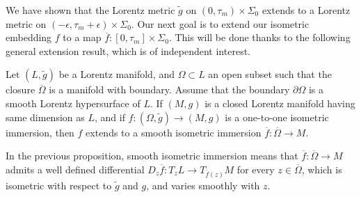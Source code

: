 We have shown that the Lorentz metric $\tilde{g}$ on $(0,\tau_m) \times \Sigma_0$ extends to a Lorentz metric on $(-\epsilon, \tau_m+\epsilon) \times \Sigma_0$. Our next goal is to extend our isometric embedding $f$ to a map $\overline{f}: [0,\tau_m] \times \Sigma_0$. This will be done thanks to the following general extension result, which is of independent interest.


\begin{prop}\label{prop.extension}
Let $(L,\tilde{g})$ be a Lorentz manifold, and $\Omega \subset L$ an open subset such that the closure $\overline{\Omega}$ is a manifold with boundary. Assume that the boundary $\partial \Omega$ is a smooth Lorentz hypersurface of $L$. If $(M,g)$ is a closed Lorentz manifold having same dimension as $L$, and if $f: (\Omega,\tilde{g}) \to (M,g)$ is a one-to-one isometric immersion, then $f$ extends to a smooth isometric immersion $\overline{f} : \overline{ \Omega} \to M$.
\end{prop}

In the previous proposition, smooth isometric immersion means that $\overline{f}: \overline{\Omega} \to M$ admits a well defined differential $D_z{\overline{f}}: T_zL \to T_{\overline{f}(z)}M$ for every $z \in \overline{\Omega}$, which is isometric with respect to $\tilde{g}$ and $g$, and varies smoothly with $z$.

